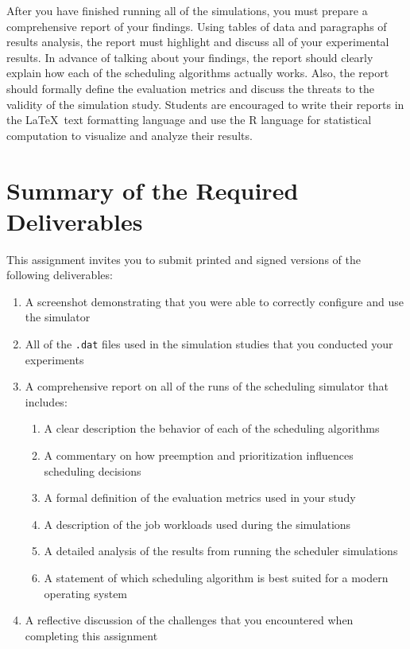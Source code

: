   After you have finished running all of the simulations, you must prepare a comprehensive report of your findings.
  Using tables of data and paragraphs of results analysis, the report must highlight and discuss all of your
  experimental results. In advance of talking about your findings, the report should clearly explain how each of the
  scheduling algorithms actually works. Also, the report should formally define the evaluation metrics and discuss the
  threats to the validity of the simulation study. Students are encouraged to write their reports in the
  \LaTeX~text formatting language and use the R language for statistical computation to visualize and analyze their results.

\section*{Summary of the Required Deliverables}

This assignment invites you to submit printed and signed versions of the following deliverables: 

\begin{enumerate}

  \itemsep0in

  \item A screenshot demonstrating that you were able to correctly configure and use the simulator

  \item All of the {\tt .dat} files used in the simulation studies that you conducted your experiments

  \item A comprehensive report on all of the runs of the scheduling simulator that includes:

  \begin{enumerate}

  \itemsep0in
    \item A clear description the behavior of each of the scheduling algorithms
    \item A commentary on how preemption and prioritization influences scheduling decisions
    \item A formal definition of the evaluation metrics used in your study
    \item A description of the job workloads used during the simulations
    \item A detailed analysis of the results from running the scheduler simulations
    \item A statement of which scheduling algorithm is best suited for a modern operating system

  \end{enumerate}

  \item A reflective discussion of the challenges that you encountered when completing this assignment

\end{enumerate}

